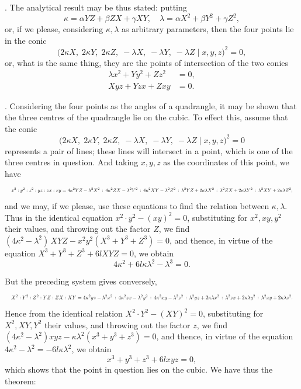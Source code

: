 \documentclass[11pt]{article}
\begin{document}
\medskip

. The analytical result may be thus stated: putting
\[
\kappa = \alpha Y Z + \beta Z X + \gamma X Y,\quad \lambda = \alpha X^2 + \beta Y^2 + \gamma Z^2,
\]
or, if we please, considering $\kappa, \lambda$ as arbitrary parameters, then the four points lie in the conic
\[
\bigl(2 \kappa X,\; 2 \kappa Y,\; 2 \kappa Z,\; -\lambda X,\; -\lambda Y,\; -\lambda Z \mid x, y, z\bigr)^2 = 0,
\]
or, what is the same thing, they are the points of intersection of the two conies
\begin{align*}
\lambda x^2 + Y y^2 + Z z^2 &= 0, \\
X y z + Y z x + Z x y &= 0.
\end{align*}

\medskip

. Considering the four points as the angles of a quadrangle, it may be shown that the three centres of the quadrangle lie on the cubic. To effect this, assume that the conic
\[
\bigl(2 \kappa X,\; 2 \kappa Y,\; 2 \kappa Z,\; -\lambda X,\; -\lambda Y,\; -\lambda Z \mid x, y, z\bigr)^2 = 0
\]
represents a pair of lines; these lines will intersect in a point, which is one of the three centres in question. And taking $x, y, z$ as the coordinates of this point, we have
\[
\resizebox{\textwidth}{!}{$\displaystyle x^2 : y^2 : z^2 : y z : z x : x y = 4 \kappa^2 Y Z - \lambda^2 X^2 \,:\, 4 \kappa^2 Z X - \lambda^2 Y^2 \,:\, 4 \kappa^2 X Y - \lambda^2 Z^2 \,:\, \lambda^2 Y Z + 2 \kappa\lambda X^2 \,:\, \lambda^2 Z X + 2 \kappa\lambda Y^2 \,:\, \lambda^2 X Y + 2 \kappa\lambda Z^2;$}
\]
and we may, if we please, use these equations to find the relation between $\kappa, \lambda$. Thus in the identical equation $x^2 \cdot y^2 - (xy)^2 = 0$, substituting for $x^2, x y, y^2$ their values, and throwing out the factor $Z$, we find $(4 \kappa^2 - \lambda^2)\,X Y Z - x^2 y^2 (X^3 + Y^3 + Z^3) = 0$, and thence, in virtue of the equation $X^3 + Y^3 + Z^3 + 6 l X Y Z = 0$, we obtain
\[
4 \kappa^2 + 6 l \kappa\lambda^2 - \lambda^3 = 0.
\]

But the preceding system gives conversely,
\[
\resizebox{\textwidth}{!}{$\displaystyle X^2 : Y^2 : Z^2 : Y Z : Z X : X Y = 4 \kappa^2 y z - \lambda^2 x^2 \,:\, 4 \kappa^2 z x - \lambda^2 y^2 \,:\, 4 \kappa^2 x y - \lambda^2 z^2 \,:\, \lambda^2 y z + 2 \kappa\lambda x^2 \,:\, \lambda^2 z x + 2 \kappa\lambda y^2 \,:\, \lambda^2 x y + 2 \kappa\lambda z^2.$}
\]
Hence from the identical relation $X^2 \cdot Y^2 - (X Y)^2 = 0$, substituting for $X^2, X Y, Y^2$ their values, and throwing out the factor $z$, we find $(4 \kappa^2 - \lambda^2) x y z - \kappa\lambda^2 (x^3 + y^3 + z^3) = 0$, and thence, in virtue of the equation $4 \kappa^2 - \lambda^2 = -6 l \kappa\lambda^2$, we obtain
\[
x^3 + y^3 + z^3 + 6 l x y z = 0,
\]
which shows that the point in question lies on the cubic. We have thus the theorem:
\end{document}
